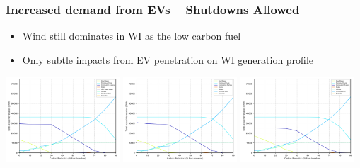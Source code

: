 \documentclass[xcolor=dvipsnames]{beamer}
\begin{document}
\begin{frame}  \frametitle{Increased demand from EVs -- Shutdowns Allowed}
\begin{itemize}
  \item Wind still dominates in WI as the low carbon fuel
  \item Only subtle impacts from EV penetration on WI generation profile
\end{itemize}
  \includegraphics[width=0.32\textwidth]{includes/no_leakage_shutdowns_5pct_EVs_agg_generation_cntlreg.png}  \includegraphics[width=0.32\textwidth]{includes/no_leakage_shutdowns_20pct_EVs_agg_generation_cntlreg.png}
  \includegraphics[width=0.32\textwidth]{includes/no_leakage_shutdowns_50pct_EVs_agg_generation_cntlreg.png}
  
  
  
%
%

\end{frame}
\end{document}

